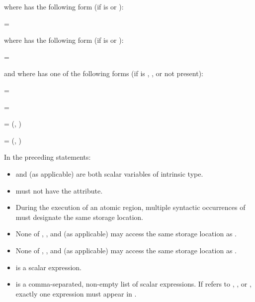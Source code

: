 \begin{fortranspecific}
where  has the following form (if 
is  or ):

\begin{indentedcodelist}
 = 
\end{indentedcodelist}

where  has the following form (if 
is  or ):

\begin{indentedcodelist}
 = 
\end{indentedcodelist}

and where  has one of the following forms (if  is ,
, or not present):

\begin{indentedcodelist}
 = 

 = 

 =  (, )

 =  (, )
\end{indentedcodelist}

In the preceding statements:

\begin{itemize}
\item {} and  (as applicable) are both scalar variables of intrinsic type.


\item {} must not have the  attribute.


\item During the execution of an atomic region, multiple syntactic occurrences of  must
designate the same storage location.


\item None of , , and  (as applicable) may access the same storage location as
.


\item None of , , and  (as applicable) may access the same storage location as
.


\item {} is a scalar expression.


\item {} is a comma-separated, non-empty list of scalar expressions. If
 refers to , , or , exactly one expression
must appear in .



\end{itemize}
\end{fortranspecific}
